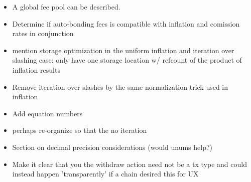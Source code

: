 \documentclass[]{article}
\begin{document}
\begin{itemize}
	\item A global fee pool can be described.
	\item Determine if auto-bonding fees is compatible with inflation and comission rates in conjunction
	\item mention storage optimization in the uniform inflation and iteration over slashing case: only have one storage location w/ refcount of the product of inflation results
	\item Remove iteration over slashes by the same normalization trick used in inflation
	\item Add equation numbers
	\item perhaps re-organize so that the no iteration
	\item Section on decimal precision considerations (would unums help?)
	\item Make it clear that you the withdraw action need not be a tx type and could instead happen 'transparently' if a chain desired this for UX
	
\end{itemize}
\end{document}
